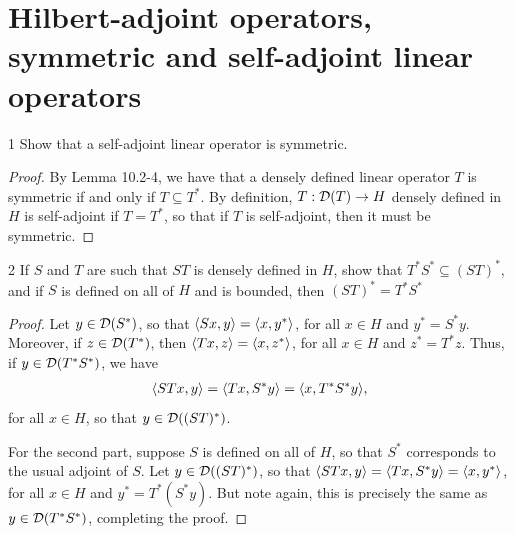 \section{Hilbert-adjoint operators, symmetric and self-adjoint linear operators}


\begin{exercise}{1}
Show that a self-adjoint linear operator is symmetric.
\end{exercise}
\begin{proof}
By Lemma 10.2-4, we have that a densely defined linear operator $T$ is symmetric if and only if $T \subseteq T^\ast$.
By definition, $T: \mathcal{D}(T) \to H$ densely defined in $H$ is self-adjoint if $T = T^\ast$, so that if $T$ is self-adjoint, then it must be symmetric.
\end{proof} 

\begin{exercise}{2}
If $S$ and $T$ are such that $ST$ is densely defined in $H$, show that $T^\ast S^\ast \subseteq (ST)^\ast$, and if $S$ is defined on all of $H$ and is bounded, then $(S T)^\ast = T^\ast S^\ast $
\end{exercise}
\begin{proof}
Let $y \in \mathcal{D}(S^\ast)$, so that $\langle Sx, y\rangle = \langle x, y^\ast\rangle$, for all $x \in H$ and $y^\ast = S^\ast y$.
Moreover, if $z \in \mathcal{D}(T^\ast)$, then $\langle Tx, z\rangle = \langle x, z^\ast\rangle$, for all $x \in H$ and $z^\ast = T^\ast z$.
Thus, if $y \in \mathcal{D}(T^\ast S^\ast)$, we have
\begin{align*}
    \langle STx, y\rangle
    = \langle Tx, S^\ast y\rangle
    = \langle x, T^\ast S^\ast y\rangle,
\end{align*}
for all $x \in H$, so that $y \in \mathcal{D}((ST)^\ast)$.

For the second part, suppose $S$ is defined on all of $H$, so that $S^\ast$ corresponds to the usual adjoint of $S$.
Let $y \in \mathcal{D}((ST)^\ast)$, so that $\langle ST x, y\rangle = \langle Tx, S^\ast y\rangle = \langle x, y^\ast\rangle$, for all $x \in H$ and $y^\ast = T^\ast (S^\ast y)$.
But note again, this is precisely the same as $y \in \mathcal{D}(T^\ast S^\ast)$, completing the proof.
\end{proof} 

